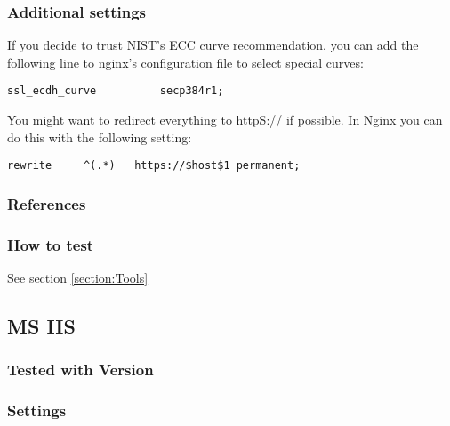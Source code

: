\subsubsection{Additional settings}

If you decide to trust NIST's ECC curve recommendation, you can add the following line to nginx's configuration file to select special curves:

\begin{lstlisting}[breaklines]
  ssl_ecdh_curve          secp384r1;
\end{lstlisting}

You might want to redirect everything to httpS:// if possible. In Nginx you can do this with the following setting:

\begin{lstlisting}[breaklines]
  rewrite     ^(.*)   https://$host$1 permanent;
\end{lstlisting}


\subsubsection{References} 

\subsubsection{How to test}
See section \ref{section:Tools}






\subsection{MS IIS}
\label{sec:ms-iis}




\subsubsection{Tested with Version} 

\subsubsection{Settings}


